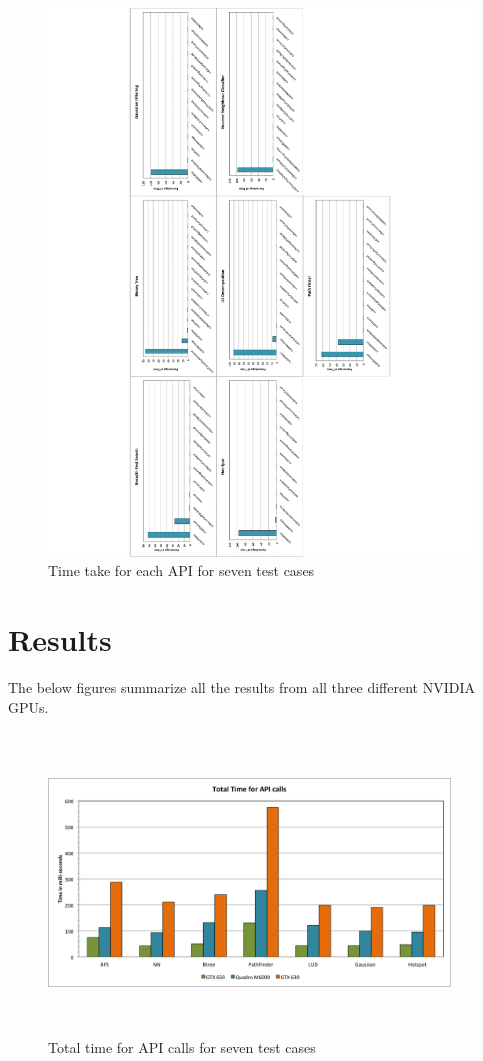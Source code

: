 \documentclass[paper=a4, fontsize=11pt]{scrartcl}
\numberwithin{equation}{section}		%
\numberwithin{figure}{section}			%
\numberwithin{table}{section}				%
\begin{document}
\begin{figure}[!h]
\centering
\includegraphics[scale=0.6]{../imgs/m6000.pdf}
\caption{Time take for each API for seven test cases}
\label{Time take for each API for seven test cases}
\end{figure}

\newpage
\section{Results}

The below figures summarize all the results from all three different NVIDIA GPUs. 

\begin{figure}[!h]
\centering
\includegraphics[width=0.95\textwidth,height=8cm]{../imgs/api_calls.png}
\caption{Total time for API calls for seven test cases}
\label{Total time for API calls for seven test cases}
\end{figure}
\end{document}
